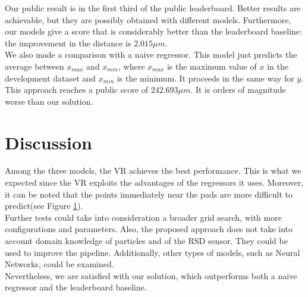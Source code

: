\documentclass[conference]{IEEEtran}
\begin{document}
Our public result is in the first third of the public leaderboard. Better results are achievable, but they are possibly obtained with different models. Furthermore, our models give a score that is considerably better than the leaderboard baseline: the improvement in the distance is $2.015 \mu m$.\\
We also made a comparison with a naive regressor. This model just predicts the average between $x_{max}$ and $x_{min}$, where $x_{max}$ is the maximum value of $x$ in the development dataset and $x_{min}$ is the minimum. It proceeds in the same way for $y$.
This approach reaches a public score of $242.693 \mu m$. It is orders of magnitude worse than our solution. \\



\section{Discussion}
Among the three models, the VR achieves the best performance. This is what we expected since the VR exploits the advantages of the regressors it uses. Moreover, it can be noted that the points immediately near the pads are more difficult to predict(see Figure \ref{}).\\ 

Further tests could take into consideration a broader grid search, with more configurations and parameters. Also, the proposed approach does not take into account domain knowledge of particles and of the RSD sensor. They could be used to improve the pipeline. Additionally, other types of models, such as Neural Networks, could be examined.\\
Nevertheless, we are satisfied with our solution, which outperforms both a naive regressor and the leaderboard baseline.




\end{document}
